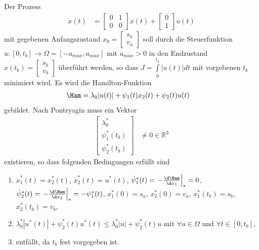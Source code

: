 \begin{exmp}
Der Prozess
\begin{align*}
	\dot{x}(t) & = \begin{bmatrix}
	0 & 1 \\ 0 & 0
	\end{bmatrix}x(t) + \begin{bmatrix}
	0\\ 1
	\end{bmatrix}u(t)
\end{align*}
mit gegebenen Anfangszustand $x_0=\begin{bmatrix}
s_a\\ v_a
\end{bmatrix}$ soll durch die Steuerfunktion $u:[0,t_b]\rightarrow\Omega=[-a_{max},a_{max}]$ mit $a_{max}>0$ in den Endzustand $x(t_b)=\begin{bmatrix}
s_b\\ v_b
\end{bmatrix}$ überführt werden, so dass $J=\int\limits_0^{t_b}|u(t)|dt$ mit vorgebenen $t_b$ minimiert wird. Es wird die Hamilton-Funktion
\begin{align*}
	\Ham & = \lambda_0|u(t)|+\psi_1(t)x_2(t)+\psi_2(t)u(t)
\end{align*}
gebildet. Nach Pontryagin muss ein Vektor 
\begin{align*}
	\begin{bmatrix}
	\lambda_0^{\ast}\\ \psi_1^{\ast}(t_b)\\ \psi_2^{\ast}(t_b)
	\end{bmatrix} & \neq 0 \in\mathbb{R}^3
\end{align*}
existieren, so dass folgenden Bedingungen erfüllt sind
\begin{enumerate}[label=(\alph*)]
  \item $\dot{x}_1^{\ast}(t)=x_2^{\ast}(t)$, $\dot{x}_2^{\ast}(t)=u^{\ast}(t)$, $\dot{\psi}_1^{\ast}(t)=\left.-\frac{\d \Ham}{\d
  x_1}\right|_{\ast}=0$, $\dot{\psi}_2^{\ast}(t)=\left.-\frac{\d \Ham}{\d x_2}\right|_{\ast}=-\psi_1^{\ast}(t)$, $x_1^{\ast}(0)=s_a$,
  $x_2^{\ast}(0)=v_a$, $x_1^{\ast}(t_b)=s_b$, $x_2^{\ast}(t_b)=v_b$,
  \item $\lambda_0^{\ast}\left|u^{\ast}(t) \right|+\psi_2^{\ast}(t)u^{\ast}(t)\leq \lambda_0^{\ast}\left|u
  \right|+\psi_2^{\ast}(t)u $ mit $\forall u\in\Omega$ und $\forall t\in[0,t_b]$,
  \item entfällt, da $t_b$ fest vorgegeben ist.
\end{enumerate}

\end{exmp}

